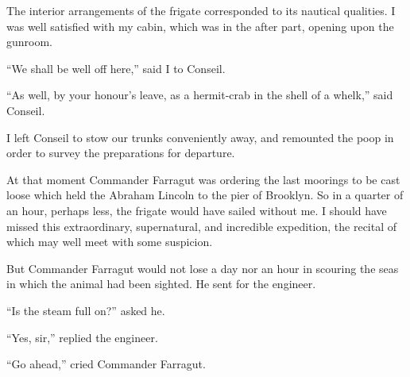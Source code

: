 The interior arrangements of the frigate corresponded to its
nautical qualities.  I was well satisfied with my cabin,
which was in the after part, opening upon the gunroom.

``We shall be well off here,'' said I to Conseil.

``As well, by your honour's leave, as a hermit-crab in the shell
of a whelk,'' said Conseil.

I left Conseil to stow our trunks conveniently away, and remounted
the poop in order to survey the preparations for departure.

At that moment Commander Farragut was ordering the last moorings
to be cast loose which held the Abraham Lincoln to the pier
of Brooklyn.  So in a quarter of an hour, perhaps less,
the frigate would have sailed without me.  I should have missed
this extraordinary, supernatural, and incredible expedition,
the recital of which may well meet with some suspicion.

But Commander Farragut would not lose a day nor an hour
in scouring the seas in which the animal had been sighted.
He sent for the engineer.

``Is the steam full on?'' asked he.

``Yes, sir,'' replied the engineer.

``Go ahead,'' cried Commander Farragut.
